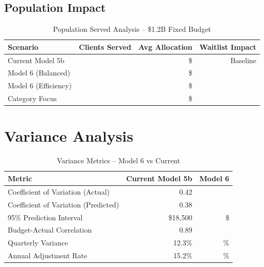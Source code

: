 \subsection{Population Impact}

\begin{table}[h]
\centering
\caption{Population Served Analysis -- \$1.2B Fixed Budget}
\begin{tabular}{lrrr}
\toprule
\textbf{Scenario} & \textbf{Clients Served} & \textbf{Avg Allocation} & \textbf{Waitlist Impact} \\
\midrule
Current Model 5b & \ModelSixPopcurrentbaselineClients{} & \$\ModelSixPopcurrentbaselineAvgAlloc{} & Baseline \\
Model 6 (Balanced) & \ModelSixPopmodelbalancedClients{} & \$\ModelSixPopmodelbalancedAvgAlloc{} & \ModelSixPopmodelbalancedWaitlistChange{} \\
Model 6 (Efficiency) & \ModelSixPopmodelefficiencyClients{} & \$\ModelSixPopmodelefficiencyAvgAlloc{} & \ModelSixPopmodelefficiencyWaitlistChange{} \\
Category Focus & \ModelSixPopcategoryfocusedClients{} & \$\ModelSixPopcategoryfocusedAvgAlloc{} & \ModelSixPopcategoryfocusedWaitlistChange{} \\
\bottomrule
\end{tabular}
\end{table}

\section{Variance Analysis}

\begin{table}[h]
\centering
\caption{Variance Metrics -- Model 6 vs Current}
\begin{tabular}{lrr}
\toprule
\textbf{Metric} & \textbf{Current Model 5b} & \textbf{Model 6} \\
\midrule
Coefficient of Variation (Actual) & 0.42 & \ModelSixCVActual{} \\
Coefficient of Variation (Predicted) & 0.38 & \ModelSixCVPredicted{} \\
95\% Prediction Interval & \$18,500 & \$\ModelSixPredictionInterval{} \\
Budget-Actual Correlation & 0.89 & \ModelSixBudgetActualCorr{} \\
Quarterly Variance & 12.3\% & \ModelSixQuarterlyVariance{}\% \\
Annual Adjustment Rate & 15.2\% & \ModelSixAnnualAdjustmentRate{}\% \\
\bottomrule
\end{tabular}
\end{table}

